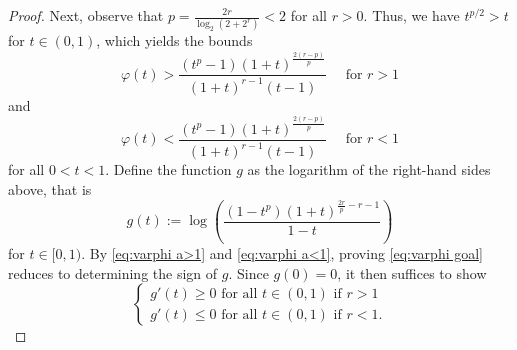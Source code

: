 \documentclass[reqno, 10pt]{amsart}
\theoremstyle{plain}
\numberwithin{equation}{section}
\theoremstyle{definition}
\newtheorem*{induction hypothesis}{Induction hypothesis}
\theoremstyle{remark}
\begin{document}
\begin{proof}
Next, observe that $p=\frac{2r}{\log_2(2+2^r)} < 2$ for all $r>0$. Thus, we have $t^{p/2} > t$ for $t \in (0, 1)$, which yields the bounds 
\begin{equation}\label{eq:varphi a>1}
    \varphi(t) > \frac{(t^p-1)(1+t)^{\frac{2(r-p)}{p}}}{(1+t)^{r-1}(t-1)}  \quad \text{ for $r >1$}
\end{equation}
and
\begin{equation}\label{eq:varphi a<1}
\varphi(t) < \frac{(t^p-1)(1+t)^{\frac{2(r-p)}{p}}}{(1+t)^{r-1}(t-1)} \quad \text{ for $r <1$}
\end{equation}
for all $0 < t < 1$. Define the function $g$ as the logarithm of the right-hand sides above, that is
\[g(t) := \log \left( \frac{(1-t^p)(1+t)^{\frac{2r}{p} - r - 1}}{1-t} \right) \] 
for $t \in [0, 1)$. By \eqref{eq:varphi a>1} and \eqref{eq:varphi a<1}, proving \eqref{eq:varphi goal} reduces to determining the sign of $g$. Since $g(0)=0$, it then suffices to show
\begin{equation}\label{eq:g' goal}
    \begin{cases}
        g'(t) \geq 0 \text{ for all } t \in (0,1) \text{ if $r >1$} \\
        g'(t) \leq 0 \text{ for all } t \in (0,1) \text{ if $r <1$}.
    \end{cases}
\end{equation}


\end{proof}
\end{document}
